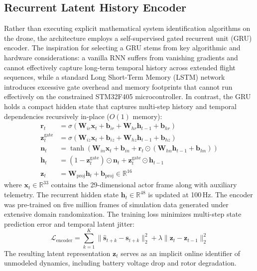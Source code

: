 \documentclass[11pt,a4paper]{article}
\begin{document}
\subsection{Recurrent Latent History Encoder}
Rather than executing explicit mathematical system identification algorithms on the drone, the architecture employs a self-supervised gated recurrent unit (GRU) encoder. The inspiration for selecting a GRU stems from key algorithmic and hardware considerations: a vanilla RNN suffers from vanishing gradients and cannot effectively capture long-term temporal history across extended flight sequences, while a standard Long Short-Term Memory (LSTM) network introduces excessive gate overhead and memory footprints that cannot run effectively on the constrained STM32F405 microcontroller. In contrast, the GRU holds a compact hidden state that captures multi-step history and temporal dependencies recursively in-place ($O(1)$ memory):
\begin{align}
  \mathbf{r}_t &= \sigma\left(\mathbf{W}_{ir} \mathbf{x}_t + \mathbf{b}_{ir} + \mathbf{W}_{hr} \mathbf{h}_{t-1} + \mathbf{b}_{hr}\right) \\
  \mathbf{z}_t^{\text{gate}} &= \sigma\left(\mathbf{W}_{iz} \mathbf{x}_t + \mathbf{b}_{iz} + \mathbf{W}_{hz} \mathbf{h}_{t-1} + \mathbf{b}_{hz}\right) \\
  \mathbf{n}_t &= \tanh\left(\mathbf{W}_{in} \mathbf{x}_t + \mathbf{b}_{in} + \mathbf{r}_t \odot (\mathbf{W}_{hn} \mathbf{h}_{t-1} + \mathbf{b}_{hn})\right) \\
  \mathbf{h}_t &= (1 - \mathbf{z}_t^{\text{gate}}) \odot \mathbf{n}_t + \mathbf{z}_t^{\text{gate}} \odot \mathbf{h}_{t-1} \\
  \mathbf{z}_t &= \mathbf{W}_{\text{proj}} \mathbf{h}_t + \mathbf{b}_{\text{proj}} \in \mathbb{R}^{16}
\end{align}
where $\mathbf{x}_t \in \mathbb{R}^{33}$ contains the 29-dimensional actor frame along with auxiliary telemetry. The recurrent hidden state $\mathbf{h}_t \in \mathbb{R}^{48}$ is updated at 100\,Hz. The encoder was pre-trained on five million frames of simulation data generated under extensive domain randomization. The training loss minimizes multi-step state prediction error and temporal latent jitter:
\begin{equation}
  \mathcal{L}_{\text{encoder}} = \sum_{k=1}^K \|\hat{\mathbf{s}}_{t+k} - \mathbf{s}_{t+k}\|_2^2 + \lambda \|\mathbf{z}_t - \mathbf{z}_{t-1}\|_2^2
\end{equation}
The resulting latent representation $\mathbf{z}_t$ serves as an implicit online identifier of unmodeled dynamics, including battery voltage drop and rotor degradation.
\end{document}
